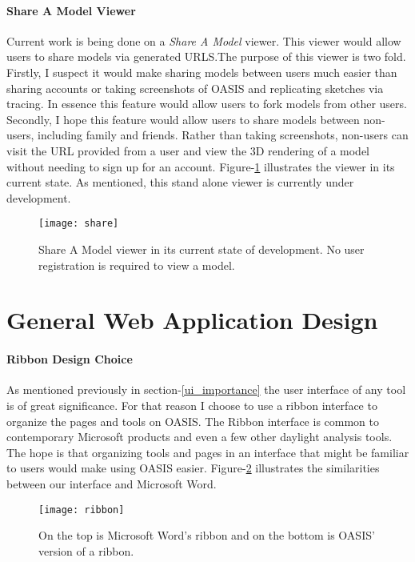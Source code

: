 \paragraph{Share A Model Viewer}
Current work is being done on a \textit{Share A Model} viewer. This viewer would allow users to share models via generated URLS.The purpose of this viewer is two fold. Firstly, I suspect it would make sharing models between users much easier than sharing accounts or taking screenshots of OASIS and replicating sketches via tracing. In essence this feature would allow users to fork models from other users. Secondly, I hope this feature would allow users to share models between non-users, including family and friends. Rather than taking screenshots, non-users can visit the URL provided from a user and view the 3D rendering of a model without needing to sign up for an account. Figure-\ref{fig:share} illustrates the viewer in its current state. As mentioned, this stand alone viewer is currently under development.
\begin{figure}[h]
\centering
\texttt{[image: share]}
\caption{Share A Model viewer in its current state of development. No user registration is required to view a model.}
\label{fig:share}
\end{figure}

\section{General Web Application Design}

\paragraph{Ribbon Design Choice} As mentioned previously in section-\ref{ui_importance} the user interface of any tool is of great significance. 
For that reason I choose to use a ribbon interface to organize the pages and tools on OASIS. 
The Ribbon interface is common to contemporary Microsoft products and even a few other daylight analysis tools\cite{todo}.
The hope is that organizing tools and pages in an interface that might be familiar to users would make using OASIS easier. Figure-\ref{fig:ribbon} illustrates the similarities between our interface and Microsoft Word.


\begin{figure}[h]
\centering
\texttt{[image: ribbon]}
\caption{On the top is Microsoft Word's ribbon and on the bottom is OASIS' version of a ribbon.}
\label{fig:ribbon}
\end{figure}


